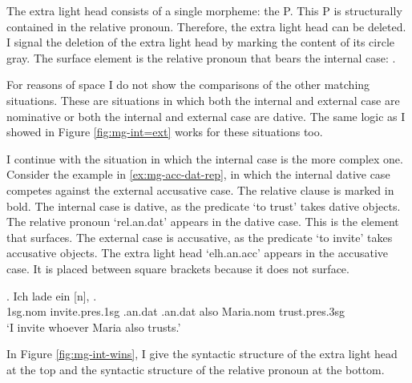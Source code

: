 The extra light head consists of a single morpheme: the P.
This P is structurally contained in the relative pronoun. Therefore, the extra light head can be deleted. I signal the deletion of the extra light head by marking the content of its circle gray.
The surface element is the relative pronoun that bears the internal case: .

For reasons of space I do not show the comparisons of the other matching situations. These are situations in which both the internal and external case are nominative or both the internal and external case are dative. The same logic as I showed in Figure \ref{fig:mg-int=ext} works for these situations too.

I continue with the situation in which the internal case is the more complex one.
Consider the example in \ref{ex:mg-acc-dat-rep}, in which the internal dative case competes against the external accusative case. The relative clause is marked in bold.
The internal case is dative, as the predicate  `to trust' takes dative objects. The relative pronoun  `\ac{rel}.\ac{an}.\ac{dat}' appears in the dative case. This is the element that surfaces.
The external case is accusative, as the predicate  `to invite' takes accusative objects. The extra light head  `\ac{elh}.\ac{an}.\ac{acc}' appears in the accusative case. It is placed between square brackets because it does not surface.

\exg. Ich {lade ein} [n],    .\\
1\ac{sg}.\ac{nom} invite.\ac{pres}.1\ac{sg}\scsub{[acc]} .\ac{an}.\ac{dat} .\ac{an}.\ac{dat} also Maria.\ac{nom} trust.\ac{pres}.3\ac{sg}\scsub{[dat]}\\
`I invite whoever Maria also trusts.' \label{ex:mg-acc-dat-rep}

In Figure \ref{fig:mg-int-wins}, I give the syntactic structure of the extra light head at the top and the syntactic structure of the relative pronoun at the bottom.

